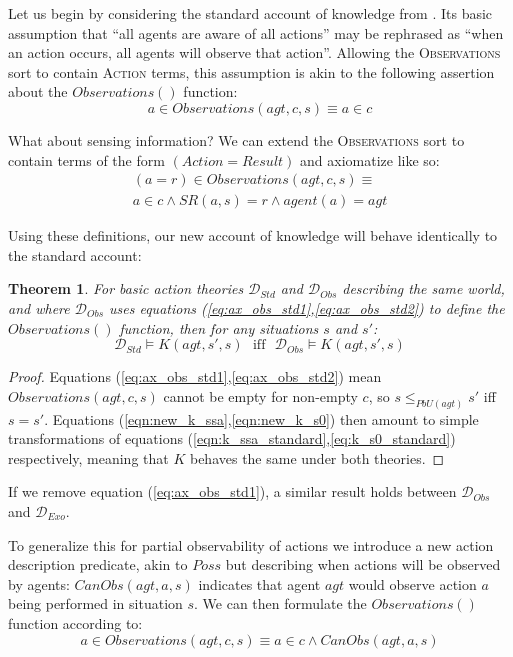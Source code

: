 \documentclass{ifaamas-submission}
\newcommand{\noun}[1]{\textsc{#1}}
\newtheorem{theorem}{Theorem}
\begin{document}
Let us begin by considering the standard account of knowledge from
\cite{scherl03sc_knowledge}. Its basic assumption that {}``all agents
are aware of all actions'' may be rephrased as {}``when an action
occurs, all agents will observe that action''. Allowing the \noun{Observations}
sort to contain \noun{Action} terms, this assumption is akin to the
following assertion about the $Observations()$ function:\begin{equation}
a\in Observations(agt,c,s)\equiv a\in c\label{eq:ax_obs_std1}\end{equation}


What about sensing information? We can extend the \noun{Observations}
sort to contain terms of the form \emph{$(Action=Result)$} and axiomatize
like so:\begin{multline}
(a=r)\in Observations(agt,c,s)\equiv\\
a\in c\wedge SR(a,s)=r\wedge agent(a)=agt\label{eq:ax_obs_std2}\end{multline}


Using these definitions, our new account of knowledge will behave
identically to the standard account:

\begin{theorem}%
For basic action theories $\mathcal{D}_{Std}$ and $\mathcal{D}_{Obs}$
describing the same world, and where $\mathcal{D}_{Obs}$ uses equations
(\ref{eq:ax_obs_std1},\ref{eq:ax_obs_std2}) to define the $Observations()$
function, then for any situations $s$ and $s'$:\[
\mathcal{D}_{Std}\models K(agt,s',s)\,\,\,\,\mathrm{iff}\,\,\,\,\mathcal{D}_{Obs}\models K(agt,s',s)\]

\end{theorem}%
\begin{proof}%
Equations (\ref{eq:ax_obs_std1},\ref{eq:ax_obs_std2}) mean $Observations(agt,c,s)$
cannot be empty for non-empty $c$, so $s\leq_{PbU(agt)}s'$ iff $s=s'$.
Equations (\ref{eqn:new_k_ssa},\ref{eqn:new_k_s0}) then amount to
simple transformations of equations (\ref{eqn:k_ssa_standard},\ref{eq:k_s0_standard})
respectively, meaning that $K$ behaves the same under both theories.
\end{proof}%
If we remove equation (\ref{eq:ax_obs_std1}), a similar result holds
between $\mathcal{D}_{Obs}$ and $\mathcal{D}_{Exo}$.

To generalize this for partial observability of actions we introduce
a new action description predicate, akin to $Poss$ but describing
when actions will be observed by agents: $CanObs(agt,a,s)$ indicates
that agent $agt$ would observe action $a$ being performed in situation
$s$. We can then formulate the $Observations()$ function according
to:\[
a\in Observations(agt,c,s)\equiv a\in c\wedge CanObs(agt,a,s)\]
\end{document}
